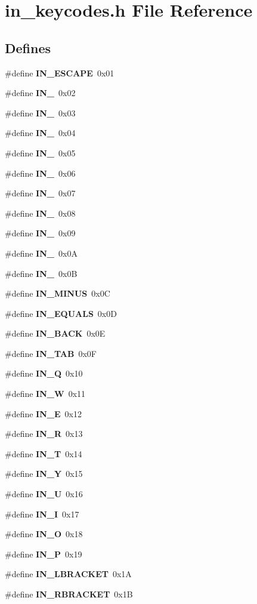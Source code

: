 \section{in\_\-keycodes.h File Reference}
\label{in__keycodes_8h}
\subsection*{Defines}
\begin{CompactItemize}
\item 
\#define {\bf IN\_\-ESCAPE}~0x01
\item 
\#define {\bf IN\_}~0x02
\item 
\#define {\bf IN\_}~0x03
\item 
\#define {\bf IN\_}~0x04
\item 
\#define {\bf IN\_}~0x05
\item 
\#define {\bf IN\_}~0x06
\item 
\#define {\bf IN\_}~0x07
\item 
\#define {\bf IN\_}~0x08
\item 
\#define {\bf IN\_}~0x09
\item 
\#define {\bf IN\_}~0x0A
\item 
\#define {\bf IN\_}~0x0B
\item 
\#define {\bf IN\_\-MINUS}~0x0C
\item 
\#define {\bf IN\_\-EQUALS}~0x0D
\item 
\#define {\bf IN\_\-BACK}~0x0E
\item 
\#define {\bf IN\_\-TAB}~0x0F
\item 
\#define {\bf IN\_\-Q}~0x10
\item 
\#define {\bf IN\_\-W}~0x11
\item 
\#define {\bf IN\_\-E}~0x12
\item 
\#define {\bf IN\_\-R}~0x13
\item 
\#define {\bf IN\_\-T}~0x14
\item 
\#define {\bf IN\_\-Y}~0x15
\item 
\#define {\bf IN\_\-U}~0x16
\item 
\#define {\bf IN\_\-I}~0x17
\item 
\#define {\bf IN\_\-O}~0x18
\item 
\#define {\bf IN\_\-P}~0x19
\item 
\#define {\bf IN\_\-LBRACKET}~0x1A
\item 
\#define {\bf IN\_\-RBRACKET}~0x1B
\item 

\end{CompactItemize}
